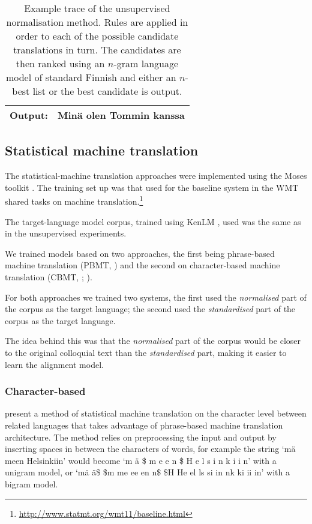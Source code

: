 \documentclass[11pt]{article}
\begin{document}
\begin{table*}
\begin{tabular}{|l|l|r|l|}
    \hline
    \textbf{Output:} & \multicolumn{3}{l|}{Min\"{a} olen Tommin kanssa} \\
    \hline
  \end{tabular}
  \caption{Example trace of the unsupervised normalisation method. Rules are applied in order to each of 
     the possible candidate translations in turn. The candidates are then ranked using an $n$-gram language model 
     of standard Finnish and either an $n$-best list
     or the best candidate is output.}
  \label{table:unsup-trace}
\end{table*}

\subsection{Statistical machine translation}

The statistical-machine translation approaches were implemented using the 
Moses toolkit \cite{koehn2007}. The training set up was that used for
the baseline system in the WMT shared tasks
on machine translation.\footnote{\url{http://www.statmt.org/wmt11/baseline.html}}

The target-language model corpus, trained using KenLM \cite{heafield2011}, used was the same as in the unsupervised experiments.  

We trained models based on two approaches, the first being phrase-based machine translation (PBMT, ) and the second on character-based machine translation (CBMT, ; ).

For both approaches we trained two systems, the first used the \emph{normalised}
part of the corpus as the target language; the second used the \emph{standardised} 
part of the corpus as the target language.

The idea behind this was that the \emph{normalised} part of the corpus would be closer
to the original colloquial text than the \emph{standardised} part, making it easier
to learn the alignment model. 

\subsubsection{Character-based}

 present a method of statistical machine translation on the character level between related languages that takes advantage of phrase-based machine translation architecture. The method relies on preprocessing the input and output by inserting spaces in between the characters of words, for example the string `m\"{a} meen Helsinkiin' would become `m \"{a} \$ m e e n \$ H e l s i n k i i n' with a unigram model, or `m\"{a} \"{a}\$ \$m me ee en n\$ \$H He el ls si in nk ki ii in' with a bigram model.
\end{document}
